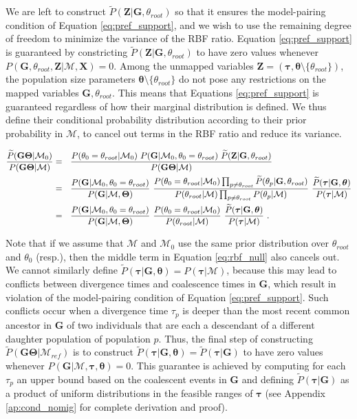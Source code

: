 \documentclass[11pt]{article}
\newcommand{\vect}[1]{\boldsymbol{\mathbf{#1}}}
\newcommand{\X}{\vect{X}}
\newcommand{\M}{\mathcal{M}}
\newcommand{\G}{\vect{G}}
\newcommand{\T}{\vect{\Theta}}
\newcommand{\GT}{\G\T}
\newcommand{\Mref}{\M_{ref}}
\newcommand{\Pref}{\widetilde{P}}
\newcommand{\1}{\mathbbm{1}}
\newcommand{\Z}{\vect{Z}}
\newcommand{\troot}{\theta_{root}}
\newcommand{\taus}{\vect\tau}
\newcommand{\thetas}{\vect\theta}
\begin{document}
We are left to construct $\Pref(\Z|\G,\troot)$ so that it ensures the model-pairing condition of Equation \ref{eq:pref_support},
and we wish to use the remaining degree of freedom to minimize the variance of the RBF ratio.
%
Equation \ref{eq:pref_support} is guaranteed by constricting $\Pref(\Z|\G,\troot)$ to have zero values whenever $P(\G,\troot,\Z|\M,\X)=0$.
%
Among the unmapped variables $\Z=(\taus,\thetas\setminus \{\troot\})$, the population size parameters $\thetas\setminus \{\troot\}$ do not 
pose any restrictions on the mapped variables $\G,\troot$. This means that Equations \ref{eq:pref_support} is guaranteed regardless of how their marginal distribution is defined.
%
We thus define their conditional probability distribution according to their prior probability in $\M$, to cancel out terms in the RBF ratio and reduce its variance.
%
\begin{small}
\begin{align}
\frac{\Pref(\GT|\M_0) }{P(\GT|\M)}
&=~~ \frac{ P(\theta_0=\troot|\M_0) ~ P(\G|\M_0,\theta_0=\troot) ~ \Pref(\Z|\G,\troot)} {P(\GT|\M)} \notag \\
&=~~ \frac{ P(\G|\M_0,\theta_0=\troot) }{ P(\G|\M,\T)}~ 
     \frac{ P(\theta_0=\troot|\M_0) \prod_{p\neq \troot}\Pref(\theta_p|\G,\troot) }{P(\troot|\M)\prod_{p\neq \troot}P(\theta_p|\M)}~
     \frac{ \Pref(\taus|\G,\thetas)}{P(\taus|\M)} \notag \\
&=~~ \frac{ P(\G|\M_0,\theta_0=\troot) }{ P(\G|\M,\T)}~ 
     \frac{ P(\theta_0=\troot|\M_0)}{P(\troot|\M)}\
     \frac{ \Pref(\taus|\G,\thetas)}{P(\taus|\M)} ~. \label{eq:rbf_null}
\end{align}
\end{small}

Note that if we assume that $\M$ and $\M_0$ use the same prior distribution over $\theta_{root}$ and $\theta_0$ (resp.),
then the middle term in Equation \ref{eq:rbf_null} also cancels out.
%
We cannot similarly define $\Pref(\taus|\G,\thetas)=P(\taus|\M)$, because this may lead to conflicts between divergence times and coalescence times in $\G$, which result in violation of
the model-pairing condition of Equation \ref{eq:pref_support}.
%
Such conflicts occur when a divergence time $\tau_p$ is deeper than the most recent common ancestor
in $\G$ of two individuals that are each a descendant of a different daughter population of population $p$.
%
%
Thus, the final step of constructing $\Pref(\GT|\Mref)$ is to construct $\Pref(\taus|\G,\thetas)=\Pref(\taus|\G)$ to have zero values whenever $P(\G|\M,\taus,\thetas)=0$.
%
This guarantee is achieved by computing for each $\tau_p$ an upper bound based on the coalescent events in $\G$
and defining $\Pref(\taus|\G)$ as a product of uniform distributions in the feasible ranges of $\taus$
%
(see  Appendix \ref{ap:cond_nomig} for complete derivation and proof).
\end{document}
